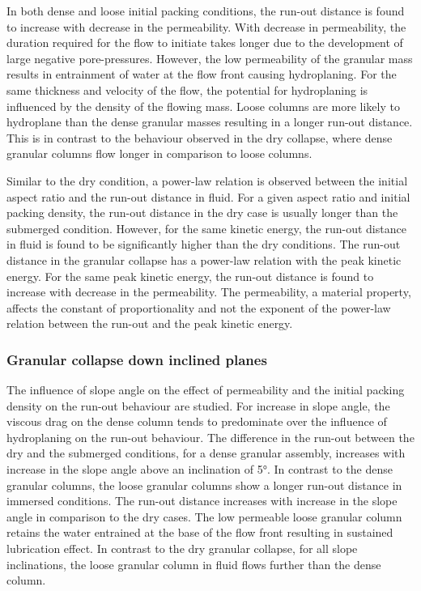 In both dense and loose initial packing conditions, the run-out distance is 
found to increase with decrease in the permeability. With decrease in 
permeability, the duration required for the flow to initiate takes longer due 
to the development of large negative pore-pressures. However, the low 
permeability of the granular mass results in entrainment of water at the flow 
front causing 
hydroplaning. For the same thickness and velocity of the flow, the potential 
for 
hydroplaning is influenced by the density of the flowing mass. Loose columns 
are more likely to hydroplane than the dense granular masses resulting in 
a longer run-out distance. This is in contrast to the behaviour observed in the 
dry collapse, where dense granular columns flow longer in comparison to loose 
columns.

Similar to the dry condition, a power-law relation is observed between the 
initial aspect ratio and the run-out distance in fluid. For a given 
aspect ratio and initial packing density, the run-out distance in the dry case 
is usually longer than the submerged condition. However, for the same kinetic 
energy, the run-out distance in fluid is found to be significantly higher than 
the dry conditions. The run-out distance in the granular collapse has a 
power-law relation with the peak kinetic energy. For the same peak kinetic 
energy, the run-out distance is found to increase with decrease in the 
permeability. The permeability, a material property, affects the constant of 
proportionality and not the exponent of the power-law relation between the 
run-out and the peak kinetic energy.


\subsubsection*{Granular collapse down inclined planes}

The influence of slope angle on the effect of permeability and the initial 
packing density on the run-out behaviour are studied. For increase in slope 
angle, the viscous drag on the dense column tends to predominate over the 
influence of hydroplaning on the run-out behaviour. The difference in the 
run-out between the dry and the submerged conditions, for a dense granular 
assembly, increases with increase in the slope angle above an inclination of 
5\si{\degree}. In contrast to the dense granular columns, the loose granular 
columns show a longer run-out distance in immersed conditions. The run-out 
distance increases with increase in the slope angle in comparison to the dry 
cases. The low permeable loose granular column retains the water entrained at 
the base of the flow front resulting in sustained lubrication effect. In 
contrast to the dry granular collapse, for all slope inclinations, the loose 
granular column in fluid flows further than the dense column. 

